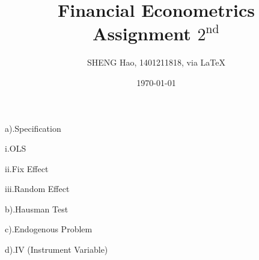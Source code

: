 \documentclass{article}
\begin{document}
\title{Financial Econometrics\\Assignment $2^{\text{nd}}$}
\author{{\normalsize SHENG Hao, 1401211818, via \LaTeX}}
\date{\today}

\maketitle

\def \Pr{{\rm Pr}}
\baselineskip 0.6cm
\begin{description}
	\item a).Specification
	\begin{description}
		\item i.OLS
		\item ii.Fix Effect
		\item iii.Random Effect
\end{description}
	\item b).Hausman Test
	\item c).Endogenous Problem
	\item d).IV (Instrument Variable)
\end{description}
\end{document}
